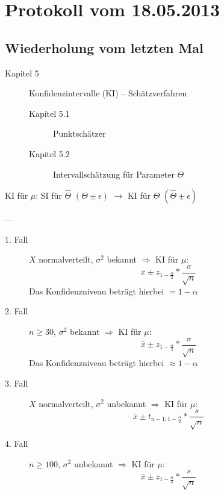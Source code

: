 \section{Protokoll vom 18.05.2013}

\subsection{Wiederholung vom letzten Mal}


\begin{description}
	\item[Kapitel 5] Konfidenzintervalle (KI) -- Schätzverfahren
	\begin{description}
		\item[Kapitel 5.1] Punktschätzer
		\item[Kapitel 5.2] Intervallschätzung für Parameter $\Theta$
	\end{description}
\end{description}

KI für $\mu$: SI für $\hat{\Theta}$ $(\Theta \pm \epsilon)$ $\to$ KI für $\Theta$ $(\hat{\Theta}  \pm \epsilon)$

---

\begin{description}
	\item[1. Fall] $X$ normalverteilt, $\sigma^2$ bekannt $\Rightarrow$ KI für $\mu$:
	\[\bar{x} \pm z_{1-\frac{\alpha}{2}} * \frac{\sigma}{\sqrt{n}}\]
	Das Konfidenzniveau beträgt hierbei $= 1 - \alpha$
	
	\item[2. Fall] $n \geq 30$, $\sigma^2$ bekannt $\Rightarrow$ KI für $\mu$:
	\[\bar{x} \pm z_{1-\frac{\alpha}{2}} * \frac{\sigma}{\sqrt{n}}\]
	Das Konfidenzniveau beträgt hierbei $\approx 1 - \alpha$
	
	\item[3. Fall] $X$ normalverteilt, $\sigma^2$ unbekannt $\Rightarrow$ KI für $\mu$:
	\[\bar{x} \pm t_{n-1; 1-\frac{\alpha}{2}} * \frac{s}{\sqrt{n}}\]
	
	\item[4. Fall] $n \geq 100$, $\sigma^2$ unbekannt $\Rightarrow$ KI für $\mu$:
	\[\bar{x} \pm z_{1-\frac{\alpha}{2}} * \frac{s}{\sqrt{n}}\]
\end{description}


\subsection{}

